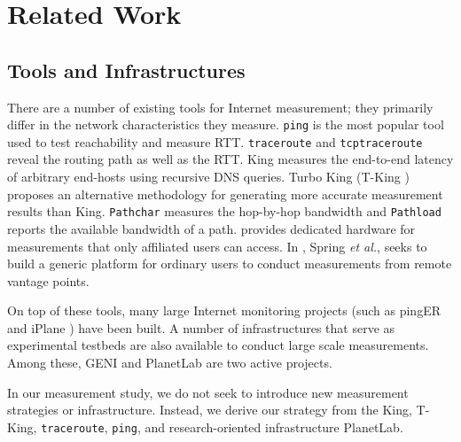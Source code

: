 \section{Related Work}
\label{sec:related-work}


\subsection{Tools and Infrastructures}
\label{sec:tools}

There are a number of existing tools for Internet measurement; they primarily differ in the network characteristics they measure. \texttt{ping} is the most popular tool used to test reachability and measure RTT. \texttt{traceroute} \cite{jacobson1989traceroute} and \texttt{tcptraceroute} \cite{toren2001tcptraceroute} reveal the routing path as well as the RTT. King \cite{gummadi2002king} measures the end-to-end latency of arbitrary end-hosts using recursive DNS queries. Turbo King (T-King \cite{leonard2008turbo}) proposes an alternative methodology for generating more accurate measurement results than King. \texttt{Pathchar} \cite{jacobson1997pathchar} measures the hop-by-hop bandwidth and \texttt{Pathload} \cite{jain2002pathload} reports the available bandwidth of a path. \cite{paxson2002experiences} provides dedicated hardware for measurements that only affiliated users can access. In \cite{spring2003scriptroute}, Spring {\it et al.}, seeks to build a generic platform for ordinary users to conduct measurements from remote vantage points.

On top of these tools, many large Internet monitoring projects (such as pingER \cite{matthews2000pinger} and iPlane \cite{madhyastha2006iplane}) have been built. A number of infrastructures that serve as experimental testbeds are also available to conduct large scale measurements. Among these, GENI \cite{elliott2008geni} and PlanetLab \cite{chun2003planetlab} are two active projects.


In our measurement study, we do not seek to introduce new measurement strategies or infrastructure. Instead, we derive our strategy from the King, T-King, \texttt{traceroute}, \texttt{ping}, and research-oriented infrastructure PlanetLab.

